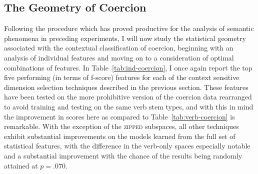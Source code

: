 \subsection{The Geometry of Coercion}
Following the procedure which has proved productive for the analysis of semantic phenomena in preceding experiments, I will now study the statistical geometry associated with the contextual classification of coercion, beginning with an analysis of individual features and moving on to a consideration of optimal combinations of features.  In Table~\ref{tab:ind-coercion}, I once again report the top five performing (in terms of f-score) features for each of the context sensitive dimension selection techniques described in the previous section.  These features have been tested on the more prohibitive version of the coercion data rearranged to avoid training and testing on the same verb stem types, and with this in mind the improvement in scores here as compared to Table~\ref{tab:verb-coercion} is remarkable.  With the exception of the \textsc{zipped} subspaces, all other techniques exhibit substantial improvements on the models learned from the full set of statistical features, with the difference in the verb-only spaces especially notable and a substantial improvement with the chance of the results being randomly attained at $p = .070$.

